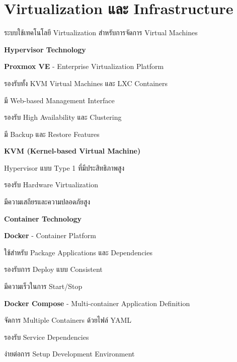 \section{Virtualization และ Infrastructure}
\hspace*{1.5em}
ระบบใช้เทคโนโลยี Virtualization สำหรับการจัดการ Virtual Machines

\vspace{0.5em}
\textbf{Hypervisor Technology}
\vspace{0.5em}

\begin{mycustomenum2}
    \item \textbf{Proxmox VE} - Enterprise Virtualization Platform
    \begin{mycustomenum2}
        \item รองรับทั้ง KVM Virtual Machines และ LXC Containers
        \item มี Web-based Management Interface
        \item รองรับ High Availability และ Clustering
        \item มี Backup และ Restore Features
    \end{mycustomenum2}

    \item \textbf{KVM (Kernel-based Virtual Machine)}
    \begin{mycustomenum2}
        \item Hypervisor แบบ Type 1 ที่มีประสิทธิภาพสูง
        \item รองรับ Hardware Virtualization
        \item มีความเสถียรและความปลอดภัยสูง
    \end{mycustomenum2}
\end{mycustomenum2}

\vspace{0.5em}
\textbf{Container Technology}
\vspace{0.5em}

\begin{mycustomenum2}
    \item \textbf{Docker} - Container Platform
    \begin{mycustomenum2}
        \item ใช้สำหรับ Package Applications และ Dependencies
        \item รองรับการ Deploy แบบ Consistent
        \item มีความเร็วในการ Start/Stop
    \end{mycustomenum2}

    \item \textbf{Docker Compose} - Multi-container Application Definition
    \begin{mycustomenum2}
        \item จัดการ Multiple Containers ด้วยไฟล์ YAML
        \item รองรับ Service Dependencies
        \item ง่ายต่อการ Setup Development Environment
    \end{mycustomenum2}
\end{mycustomenum2}

